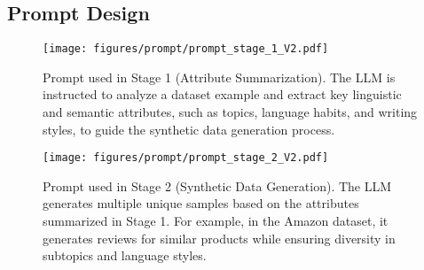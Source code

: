


\subsection{Prompt Design}

\begin{figure}[tbp]
	\centering
	\texttt{[image: figures/prompt/prompt\_stage\_1\_V2.pdf]}
	\caption{Prompt used in Stage 1 (Attribute Summarization). The LLM is instructed to analyze a dataset example and extract key linguistic and semantic attributes, such as topics, language habits, and writing styles, to guide the synthetic data generation process.}
	\label{fig:prompt_s1}
\end{figure}

\begin{figure}[bp]
	\centering
	\texttt{[image: figures/prompt/prompt\_stage\_2\_V2.pdf]}
	\caption{Prompt used in Stage 2 (Synthetic Data Generation). The LLM generates multiple unique samples based on the attributes summarized in Stage 1. For example, in the Amazon dataset, it generates reviews for similar products while ensuring diversity in subtopics and language styles.}
	\label{fig:prompt_s2}
\end{figure}

